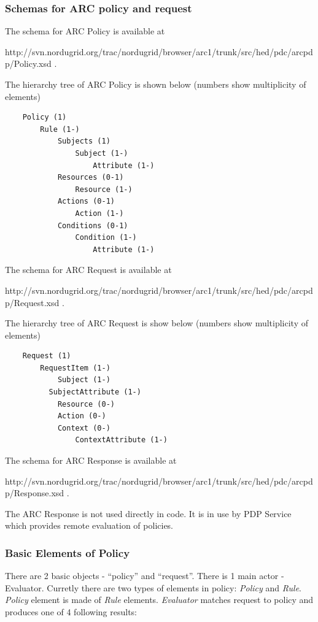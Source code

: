 \documentclass{article}                            %
\begin{document}
\subsubsection{Schemas for ARC policy and request} %
\label{subsubsec:arc_policy_schema}
The schema for ARC Policy is available at

http://svn.nordugrid.org/trac/nordugrid/browser/arc1/trunk/src/hed/pdc/arcpdp/Policy.xsd .

The hierarchy tree of ARC Policy is shown below (numbers show multiplicity of elements)

\begin{verbatim}
    Policy (1)
        Rule (1-)
            Subjects (1)
                Subject (1-)
                    Attribute (1-)
            Resources (0-1)
                Resource (1-)
            Actions (0-1)
                Action (1-)
            Conditions (0-1)
                Condition (1-)
                    Attribute (1-)
\end{verbatim}

The schema for ARC Request is available at

http://svn.nordugrid.org/trac/nordugrid/browser/arc1/trunk/src/hed/pdc/arcpdp/Request.xsd .

The hierarchy tree of ARC Request is show below (numbers show multiplicity of elements)

\begin{verbatim}
    Request (1)
        RequestItem (1-)
            Subject (1-)
          SubjectAttribute (1-)
            Resource (0-)
            Action (0-)
            Context (0-)
                ContextAttribute (1-)
\end{verbatim}


The schema for ARC Response is available at

http://svn.nordugrid.org/trac/nordugrid/browser/arc1/trunk/src/hed/pdc/arcpdp/Response.xsd .

The ARC Response is not used directly in code. It is in use by PDP Service which provides remote evaluation of policies.


\subsubsection{Basic Elements of Policy} %
\label{subsubsec:poicy_element}
There are 2 basic objects - ``policy'' and ``request''. There is 1 main actor - Evaluator. Curretly there are two types of elements in policy: \textit{Policy} and \textit{Rule}. \textit{Policy} element is made of \textit{Rule} elements.
\textit{Evaluator} matches request to policy and produces one of 4 following results:
\end{document}

